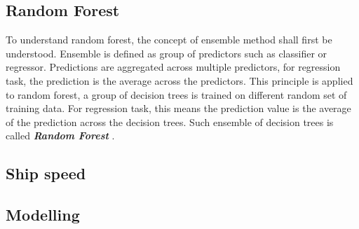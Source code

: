 \subsection{Random Forest}\label{ensemble_theo}

To understand random forest, the concept of ensemble method shall first be understood. Ensemble is defined as group of predictors such as classifier or regressor. Predictions are aggregated across multiple predictors, for regression task, the prediction is the average across the predictors. This principle is applied to random forest, a group of decision trees is trained on different random set of training data. For regression task, this means the prediction value is the average of the prediction across the decision trees. Such ensemble of decision trees is called \emph{\textbf{Random Forest}} \cite{Hastie.2009,Breiman.2001,TinKamHo.1995}.










    




\subsection{Ship speed}


\subsection{Modelling}




